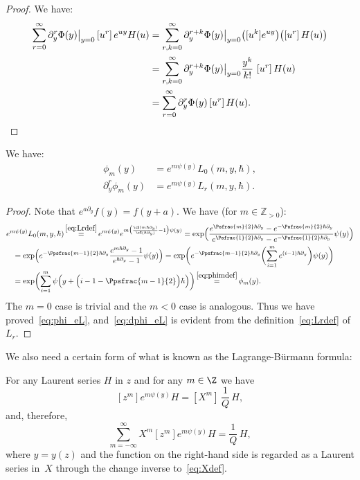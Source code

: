 \begin{proof} We have:
\begin{align*}
\sum_{r=0}^\infty \partial_y^r\Phi(y)\big|_{y=0} \,[u^r]\,e^{u y}H(u) & =
\sum_{r,k=0}^\infty \partial_y^{r+k}\Phi(y)\big|_{y=0}
\bigl([u^{k}]e^{u y}\bigr)\bigl([u^r]\,H(u)\bigr)\\
& =
\sum_{r,k=0}^\infty \partial_y^{r+k}\Phi(y)\big|_{y=0}\frac{y^k}{k!}\,
\,[u^r]\, H(u) \\
& =
\sum_{r=0}^\infty \partial_y^r\Phi(y)\,[u^r]\,H(u).\qedhere
\end{align*}
\end{proof}

\begin{lemma}
We have:
\begin{align} \label{eq:phi_eL}
\phi_m(y)&=e^{m\psi(y)}L_0(m,y,\hbar),\\ \label{eq:dphi_eL}
\partial_y^r\phi_m(y)
&=e^{m\psi(y)}L_r(m,y,\hbar).
\end{align}
\end{lemma}
\begin{proof}
Note that $e^{a\partial_y}f(y)=f(y+a)$. We have (for $m\in\mathbb{Z}_{>0}$):
\begin{align*}
&e^{m\psi(y)}L_0(m,y,\hbar) \mathop{=}^{\eqref{eq:Lrdef}}e^{m\psi(y)} e^{m\bigl(\frac{\cS(m\hbar\partial_y)}{\cS(\hbar\partial_y)}-1\bigr)\psi(y)} = \exp\Bigl(\dfrac{e^{\Psfrac{m}{2}\hbar\partial_y}-e^{-\Psfrac{m}{2}\hbar\partial_y}}{e^{\Psfrac{1}{2}\hbar\partial_y}-e^{-\Psfrac{1}{2}\hbar\partial_y}}\psi(y) \Bigr) \\
&\hspace*{3mm}=\exp \Bigl(e^{-\Ppsfrac{m-1}{2}\hbar\partial_y}\dfrac{e^{m\hbar\partial_y}-1}{e^{\hbar\partial_y}-1}\psi(y) \Bigr)=\exp \biggl(e^{-\Ppsfrac{m-1}{2}\hbar\partial_y} \biggl(\sum_{i=1}^me^{(i-1)\hbar\partial_y} \biggr)\psi(y) \biggr) \\
&\hspace*{3mm}=\exp\biggl(\sum_{i=1}^m\psi \Bigl(y+ \Bigl(i-1-\Ppsfrac{m-1}{2} \Bigr)\hbar \Bigr)\biggr) \mathop{=}^{\eqref{eq:phimdef}} \phi_m(y).
\end{align*}
The $m=0$ case is trivial and the $m<0$ case is analogous. Thus we have proved~\eqref{eq:phi_eL}, and~\eqref{eq:dphi_eL} is evident from the definition~\eqref{eq:Lrdef} of $L_r$.
\end{proof}

We also need a certain form of what is known as the Lagrange-Bürmann formula:

\begin{lemma}For any Laurent series $H$ in $z$ and for any $m\in\Z$ we have
\begin{equation*}\label{eq:LagBur}
[z^m] e^{m\psi(y)} H = [X^m] \,\frac{1}{Q}\,H,
\end{equation*}
and, therefore,
\begin{equation}\label{eq:LagBur1}
\sum_{m=-\infty}^\infty X^m [z^m] e^{m\psi(y)} H = \frac{1}{Q}\,H,
\end{equation}
where $y=y(z)$ and the function on the right-hand side is regarded as a Laurent series in~$X$ through the change inverse to~\eqref{eq:Xdef}.
\end{lemma}

